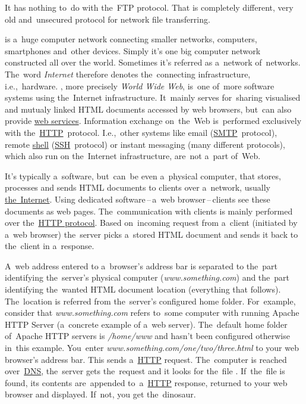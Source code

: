 \warning It has nothing to~do with the~FTP protocol.
That is completely different, very old and~unsecured protocol for network file transferring.

\label{internetweb}
\begin{itemize}
     is a~huge computer network connecting smaller networks, computers, smartphones and~other devices.
            Simply it's one big computer network constructed all over the world.
            Sometimes it's referred as a~network of~networks.
            The~word \textit{Internet} therefore denotes the~connecting infrastructure, i.e.,~hardware.
    , more precisely \textit{World Wide Web}, is~one of~more software systems using the~Internet infrastructure.
            It~mainly serves for~sharing visualised and mutualy linked HTML documents accessed by web browsers, but~can also provide \hyperref[webserviceapplication]{web services}.
            Information exchange on~the~Web is~performed exclusively with the~\hyperref[http]{HTTP}~protocol.
            I.e.,~other systems like email (\hyperref[smtp]{SMTP}~protocol), remote \hyperref[shellcligui]{shell} (\hyperref[ssh]{SSH}~protocol) or instant messaging (many different protocols), which also run on the~Internet infrastructure, are~not a~part of~Web.
\end{itemize}

\label{namespaces}

\label{webserver}
It's typically a~software, but~can~be even a~physical computer, that stores, processes and sends HTML documents to clients over a~network, usually \hyperref[internetweb]{the~Internet}.
Using dedicated software\,--\,a~web browser\,--\,clients see these documents as web pages.
The~communication with clients is mainly performed over the~\hyperref[http]{HTTP protocol}.
Based on~incoming request from a~client (initiated by a~web browser) the~server picks a~stored HTML document and sends it back to the~client in a~response.

A~web address entered to a~browser's address bar is separated to the~part identifying the~server's physical computer (\textit{www.something.com}) and the~part identifying the~wanted HTML document location (everything that follows).
The~location is referred from the~server's configured home folder.
For~example, consider that \textit{www.something.com} refers to~some computer with running Apache HTTP Server (a~concrete example of a~web server).
The~default home folder of~Apache HTTP servers is \textit{/home/www} and hasn't been configured otherwise in~this example.
You~enter \textit{www.something.com/one/two/three.html} to your web browser's address bar.
This sends a~\hyperref[http]{HTTP} request.
The~computer is reached over~\hyperref[dns]{DNS}, the~server gets the~request and it looks for the~file .
If~the~file is found, its contents are~appended to~a~\hyperref[http]{HTTP} response, returned to your web browser and displayed.
If~not, you get the~dinosaur.

